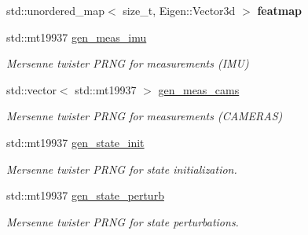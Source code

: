 \begin{DoxyCompactItemize}
\mbox{\label{classov__init_1_1SimulatorInit_a26cfaf9b3d02ad742eb1dabc40eaab32}} 
std\+::unordered\+\_\+map$<$ size\+\_\+t, Eigen\+::\+Vector3d $>$ {\bfseries featmap}
\item 
\mbox{\label{classov__init_1_1SimulatorInit_a07a8dcfb65652705d79ccade133cfac5}} 
std\+::mt19937 \hyperlink{classov__init_1_1SimulatorInit_a07a8dcfb65652705d79ccade133cfac5}{gen\+\_\+meas\+\_\+imu}
\begin{DoxyCompactList}\small\item\em Mersenne twister P\+R\+NG for measurements (I\+MU) \end{DoxyCompactList}\item 
\mbox{\label{classov__init_1_1SimulatorInit_a22c0c57b4ddbd9995b42020e1139e3ea}} 
std\+::vector$<$ std\+::mt19937 $>$ \hyperlink{classov__init_1_1SimulatorInit_a22c0c57b4ddbd9995b42020e1139e3ea}{gen\+\_\+meas\+\_\+cams}
\begin{DoxyCompactList}\small\item\em Mersenne twister P\+R\+NG for measurements (C\+A\+M\+E\+R\+AS) \end{DoxyCompactList}\item 
\mbox{\label{classov__init_1_1SimulatorInit_ad458e97f0d879d4b23fe983dec5df804}} 
std\+::mt19937 \hyperlink{classov__init_1_1SimulatorInit_ad458e97f0d879d4b23fe983dec5df804}{gen\+\_\+state\+\_\+init}
\begin{DoxyCompactList}\small\item\em Mersenne twister P\+R\+NG for state initialization. \end{DoxyCompactList}\item 
\mbox{\label{classov__init_1_1SimulatorInit_ad1183d2053b6618e3ad4f4b3616c74a6}} 
std\+::mt19937 \hyperlink{classov__init_1_1SimulatorInit_ad1183d2053b6618e3ad4f4b3616c74a6}{gen\+\_\+state\+\_\+perturb}
\begin{DoxyCompactList}\small\item\em Mersenne twister P\+R\+NG for state perturbations. \end{DoxyCompactList}\item 
\mbox{\label{classov__init_1_1SimulatorInit_a8abb917e0f329e5d8602692a5f4c2776}} 

\end{DoxyCompactItemize}
